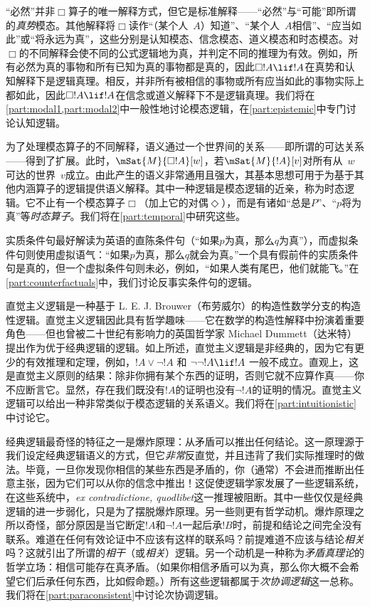 “必然”并非$\Box$算子的唯一解释方式，但它是标准解释——“必然”与“可能”即所谓的\emph{真势}模态。其他解释将$\Box$读作“（某个人~$A$）知道”、“某个人~$A$相信”、“应当如此”或“将永远为真”，这些分别是认知模态、信念模态、道义模态和时态模态。对$\Box$的不同解释会使不同的公式逻辑地为真，并判定不同的推理为有效。例如，所有必然为真的事物和所有已知为真的事物都是真的，因此$\Box !A \lif !A$在真势和认知解释下是逻辑真理。相反，并非所有被相信的事物或所有应当如此的事物实际上都如此，因此$\Box !A \lif !A$在信念或道义解释下不是逻辑真理。我们将在\cref{part:modal1,part:modal2}中一般性地讨论模态逻辑，在\cref{part:epistemic}中专门讨论认知逻辑。

为了处理模态算子的不同解释，语义通过一个世界间的关系——即所谓的可达关系——得到了扩展。此时，$\mSat{M}{\Box !A}[w]$，若$\mSat{M}{!A}[v]$对所有从~$w$可达的世界~$v$成立。由此产生的语义非常通用且强大，其基本思想可用于为基于其他内涵算子的逻辑提供语义解释。其中一种逻辑是模态逻辑的近亲，称为时态逻辑。它不止有一个模态算子$\Box$（加上它的对偶$\Diamond$），而是有诸如“总是$P$”、“$p$将为真”等\emph{时态算子}。我们将在\cref{part:temporal}中研究这些。

实质条件句最好解读为英语的直陈条件句（“如果$p$为真，那么$q$为真”），而虚拟条件句则使用虚拟语气：“如果$p$为真，那么$q$就会为真。”一个具有假前件的实质条件句是真的，但一个虚拟条件句则未必，例如，“如果人类有尾巴，他们就能飞。”在\cref{part:counterfactuals}中，我们讨论反事实条件句的逻辑。

直觉主义逻辑是一种基于 L. E. J. Brouwer（布劳威尔）的构造性数学分支的构造性逻辑。直觉主义逻辑因此具有哲学趣味——它在数学的构造性解释中扮演着重要角色——但也曾被二十世纪有影响力的英国哲学家 Michael Dummett（达米特）提出作为优于经典逻辑的逻辑。如上所述，直觉主义逻辑是非经典的，因为它有更少的有效推理和定理，例如，$!A \lor \lnot !A$ 和 $\lnot\lnot !A \lif !A$ 一般不成立。直观上，这是直觉主义原则的结果：除非你拥有某个东西的证明，否则它就不应算作真——你不应断言它。显然，存在我们既没有$!A$的证明也没有$\lnot !A$的证明的情况。直觉主义逻辑可以给出一种非常类似于模态逻辑的关系语义。我们将在\cref{part:intuitionistic}中讨论它。

经典逻辑最奇怪的特征之一是爆炸原理：从矛盾可以推出任何结论。这一原理源于我们设定经典逻辑语义的方式，但它\emph{非常}反直觉，并且违背了我们实际推理时的做法。毕竟，一旦你发现你相信的某些东西是矛盾的，你（通常）不会进而推断出任意主张，因为它们可以从你的信念中推出！这促使逻辑学家发展了一些逻辑系统，在这些系统中，\emph{ex contradictione, quodlibet}这一推理被阻断。其中一些仅仅是经典逻辑的进一步弱化，只是为了摆脱爆炸原理。另一些则更有哲学动机。爆炸原理之所以奇怪，部分原因是当它断定$!A$和$\lnot !A$一起后承$!B$时，前提和结论之间完全没有联系。难道在任何有效论证中不应该有这样的联系吗？前提难道不应该与结论\emph{相关}吗？这就引出了所谓的\emph{相干}（或\emph{相关}）逻辑。另一个动机是一种称为\emph{矛盾真理论}的哲学立场：相信可能存在真矛盾。（如果你相信矛盾可以为真，那么你大概不会希望它们后承任何东西，比如假命题。）所有这些逻辑都属于\emph{次协调逻辑}这一总称。我们将在\cref{part:paraconsistent}中讨论次协调逻辑。